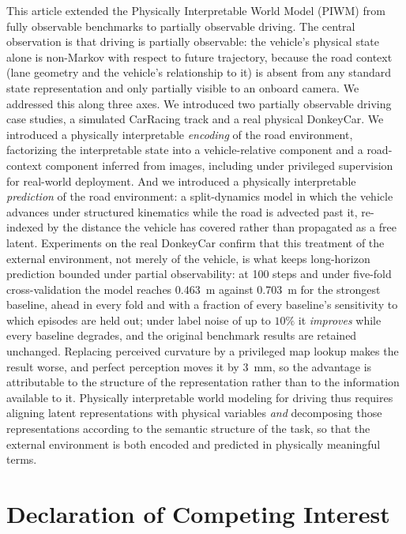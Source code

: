 \documentclass[preprint,12pt]{elsarticle}
\begin{document}
This article extended the Physically Interpretable World Model (PIWM) from fully
observable benchmarks to partially observable driving.
The central observation is that driving is partially observable: the vehicle's
physical state alone is non-Markov with respect to future trajectory, because the
road context (lane geometry and the vehicle's relationship to it) is absent from
any standard state representation and only partially visible to an onboard camera.
We addressed this along three axes.
We introduced two partially observable driving case studies, a simulated
CarRacing track and a real physical DonkeyCar.
We introduced a physically interpretable \emph{encoding} of the road environment,
factorizing the interpretable state into a vehicle-relative component and a
road-context component inferred from images, including under privileged
supervision for real-world deployment.
And we introduced a physically interpretable \emph{prediction} of the road
environment: a split-dynamics model in which the vehicle advances under structured
kinematics while the road is advected past it, re-indexed by the distance the
vehicle has covered rather than propagated as a free latent.
Experiments on the real DonkeyCar confirm that this treatment of the external
environment, not merely of the vehicle, is what keeps long-horizon prediction
bounded under partial observability: at 100 steps and under five-fold
cross-validation the model reaches \SI{0.463}{m} against \SI{0.703}{m} for the
strongest baseline, ahead in every fold and with a fraction of every baseline's
sensitivity to which episodes are held out; under label noise of up to $10\%$ it
\emph{improves} while every baseline degrades, and the original benchmark results
are retained unchanged.
Replacing perceived curvature by a privileged map lookup makes the result worse,
and perfect perception moves it by \SI{3}{mm}, so the advantage is attributable to
the structure of the representation rather than to the information available to it.
Physically interpretable world modeling for driving thus requires aligning latent
representations with physical variables \emph{and} decomposing those
representations according to the semantic structure of the task, so that the
external environment is both encoded and predicted in physically meaningful terms.


\section*{Declaration of Competing Interest}
\end{document}
